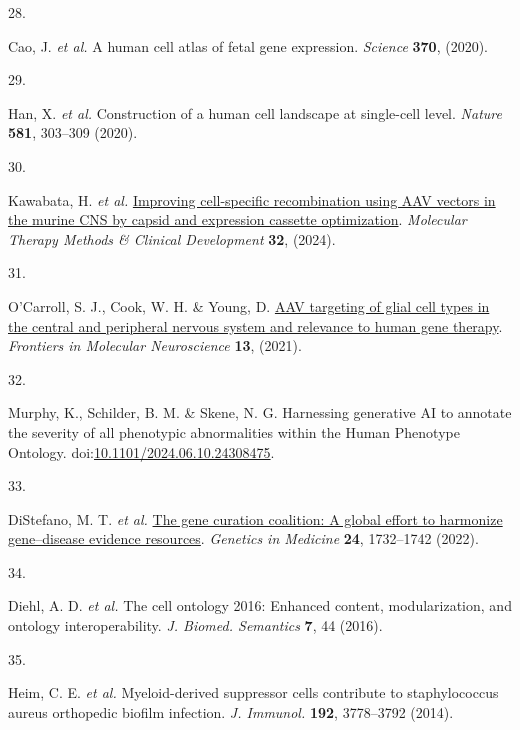 \documentclass[
]{report}
\newlength{\cslhangindent}
\newlength{\csllabelwidth}
\newenvironment{CSLReferences}[2] %
 {\begin{list}{}{%
  \setlength{\itemindent}{0pt}
  \setlength{\leftmargin}{0pt}
  \setlength{\parsep}{0pt}
  \ifodd #1
   \setlength{\leftmargin}{\cslhangindent}
   \setlength{\itemindent}{-1\cslhangindent}
  \fi
  \setlength{\itemsep}{#2\baselineskip}}}
 {\end{list}}
\newcommand{\CSLLeftMargin}[1]{\parbox[t]{\csllabelwidth}{\strut#1\strut}}
\newcommand{\CSLRightInline}[1]{\parbox[t]{\linewidth - \csllabelwidth}{\strut#1\strut}}
\begin{document}
\begin{CSLReferences}{0}{0}
\CSLLeftMargin{28. }%
\CSLRightInline{Cao, J. \emph{et al.} A human cell atlas of fetal gene
expression. \emph{Science} \textbf{370}, (2020).}

\CSLLeftMargin{29. }%
\CSLRightInline{Han, X. \emph{et al.} Construction of a human cell
landscape at single-cell level. \emph{Nature} \textbf{581}, 303--309
(2020).}

\CSLLeftMargin{30. }%
\CSLRightInline{Kawabata, H. \emph{et al.}
\href{https://doi.org/10.1016/j.omtm.2024.101185}{Improving
cell-specific recombination using AAV vectors in the murine CNS by
capsid and expression cassette optimization}. \emph{Molecular Therapy
Methods \& Clinical Development} \textbf{32}, (2024).}

\CSLLeftMargin{31. }%
\CSLRightInline{O'Carroll, S. J., Cook, W. H. \& Young, D.
\href{https://doi.org/10.3389/fnmol.2020.618020}{AAV targeting of glial
cell types in the central and peripheral nervous system and relevance to
human gene therapy}. \emph{Frontiers in Molecular Neuroscience}
\textbf{13}, (2021).}

\CSLLeftMargin{32. }%
\CSLRightInline{Murphy, K., Schilder, B. M. \& Skene, N. G. Harnessing
generative AI to annotate the severity of all phenotypic abnormalities
within the Human Phenotype Ontology.
doi:\href{https://doi.org/10.1101/2024.06.10.24308475}{10.1101/2024.06.10.24308475}.}

\CSLLeftMargin{33. }%
\CSLRightInline{DiStefano, M. T. \emph{et al.}
\href{https://doi.org/10.1016/j.gim.2022.04.017}{The gene curation
coalition: A global effort to harmonize gene--disease evidence
resources}. \emph{Genetics in Medicine} \textbf{24}, 1732--1742 (2022).}

\CSLLeftMargin{34. }%
\CSLRightInline{Diehl, A. D. \emph{et al.} The cell ontology 2016:
Enhanced content, modularization, and ontology interoperability.
\emph{J. Biomed. Semantics} \textbf{7}, 44 (2016).}

\CSLLeftMargin{35. }%
\CSLRightInline{Heim, C. E. \emph{et al.} Myeloid-derived suppressor
cells contribute to staphylococcus aureus orthopedic biofilm infection.
\emph{J. Immunol.} \textbf{192}, 3778--3792 (2014).}


\end{CSLReferences}
\end{document}
